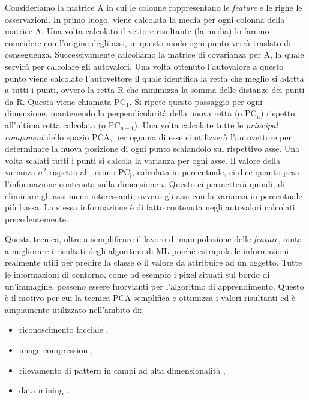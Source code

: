 \documentclass[12pt,italian]{report}
\begin{document}
Consideriamo la matrice A in cui le colonne rappresentano le \emph{feature} e le righe le osservazioni. In primo luogo, viene calcolata la media per ogni colonna della matrice A. Una volta calcolato il vettore risultante (la media) lo faremo coincidere con l'origine degli assi, in questo modo ogni punto verrà traslato di conseguenza. Successivamente calcoliamo la matrice di covarianza per A, la quale servirà per calcolare gli autovalori. Una volta ottenuto l'autovalore a questo punto viene calcolato l'autovettore il quale identifica la retta che meglio si adatta a tutti i punti, ovvero la retta R che minimizza la somma delle distanze dei punti da R. Questa viene chiamata $\mathrm{PC_1}$. Si ripete questo passaggio per ogni dimensione, mantenendo la perpendicolarità della nuova retta (o $\mathrm{PC_{n}}$) rispetto all'ultima retta calcolata (o $\mathrm{PC_{n-1}}$). 
Una volta calcolate tutte le \emph{principal component} dello spazio PCA, per ognuna di esse si utilizzerà l'autovettore per determinare la nuova posizione di ogni punto scalandolo sul rispettivo asse. Una volta scalati tutti i punti si calcola la varianza per ogni asse. Il valore della varianza $\sigma^2$ rispetto al i-esimo $\mathrm{PC_{i}}$, calcolata in percentuale, ci dice quanto pesa l'informazione contenuta sulla dimensione $i$. Questo ci permetterà quindi, di eliminare gli assi meno interessanti, ovvero gli assi con la varianza in percentuale più bassa. La stessa informazione è di fatto contenuta negli autovalori calcolati precedentemente. 

Questa tecnica, oltre a semplificare il lavoro di manipolazione delle \emph{feature}, aiuta a migliorare i risultati degli algoritmo di ML poiché estrapola le informazioni realmente utili per predire la classe o il valore da attribuire ad un oggetto. Tutte le informazioni di contorno, come ad esempio i pixel situati sul bordo di un'immagine, possono essere fuorvianti per l'algoritmo di apprendimento. Questo è il motivo per cui la tecnica PCA semplifica e ottimizza i valori risultanti ed è ampiamente utilizzato nell'ambito di:
\begin{itemize}
	\item riconoscimento facciale \cite{3d_face_recocgnition_pca},
	\item image compression \cite{image_compression_pca},
	\item rilevamento di pattern in campi ad alta dimensionalità \cite{pattern_recocgnition_pca},
	\item data mining \cite{data_mining_pca}.
\end{itemize}
\end{document}
